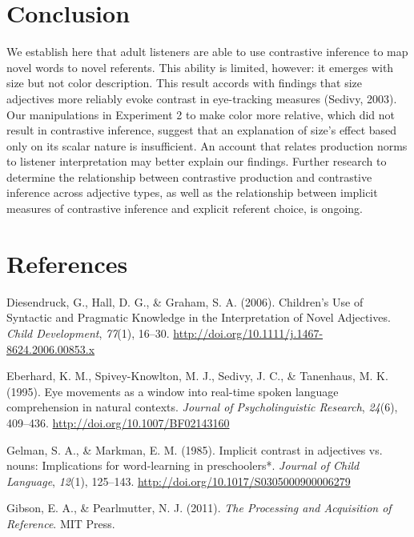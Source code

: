 \documentclass[10pt, letterpaper]{article}
\begin{document}
\section{Conclusion}\label{conclusion}

We establish here that adult listeners are able to use contrastive
inference to map novel words to novel referents. This ability is
limited, however: it emerges with size but not color description. This
result accords with findings that size adjectives more reliably evoke
contrast in eye-tracking measures (Sedivy, 2003). Our manipulations in
Experiment 2 to make color more relative, which did not result in
contrastive inference, suggest that an explanation of size's effect
based only on its scalar nature is insufficient. An account that relates
production norms to listener interpretation may better explain our
findings. Further research to determine the relationship between
contrastive production and contrastive inference across adjective types,
as well as the relationship between implicit measures of contrastive
inference and explicit referent choice, is ongoing.

\section*{References}\label{references}

\hypertarget{refs}{}
\hypertarget{ref-diesendruck_childrens_2006}{}
Diesendruck, G., Hall, D. G., \& Graham, S. A. (2006). Children's Use of
Syntactic and Pragmatic Knowledge in the Interpretation of Novel
Adjectives. \emph{Child Development}, \emph{77}(1), 16--30.
\url{http://doi.org/10.1111/j.1467-8624.2006.00853.x}

\hypertarget{ref-eberhard_eye_1995}{}
Eberhard, K. M., Spivey-Knowlton, M. J., Sedivy, J. C., \& Tanenhaus, M.
K. (1995). Eye movements as a window into real-time spoken language
comprehension in natural contexts. \emph{Journal of Psycholinguistic
Research}, \emph{24}(6), 409--436.
\url{http://doi.org/10.1007/BF02143160}

\hypertarget{ref-gelman_implicit_1985}{}
Gelman, S. A., \& Markman, E. M. (1985). Implicit contrast in adjectives
vs. nouns: Implications for word-learning in preschoolers*.
\emph{Journal of Child Language}, \emph{12}(1), 125--143.
\url{http://doi.org/10.1017/S0305000900006279}

\hypertarget{ref-gibson_processing_2011}{}
Gibson, E. A., \& Pearlmutter, N. J. (2011). \emph{The Processing and
Acquisition of Reference}. MIT Press.
\end{document}
